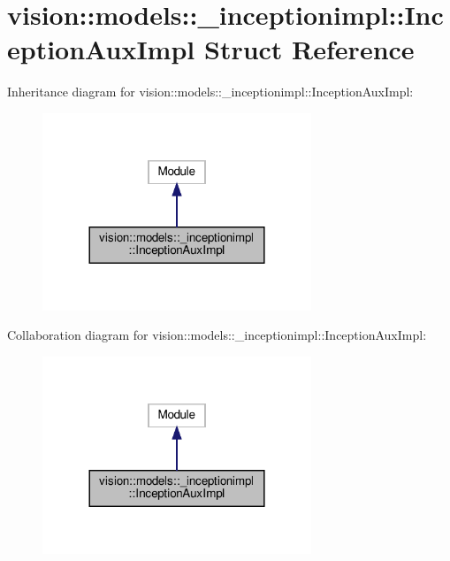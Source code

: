 \hypertarget{structvision_1_1models_1_1__inceptionimpl_1_1InceptionAuxImpl}{}\section{vision\+:\+:models\+:\+:\+\_\+inceptionimpl\+:\+:Inception\+Aux\+Impl Struct Reference}
\label{structvision_1_1models_1_1__inceptionimpl_1_1InceptionAuxImpl}


Inheritance diagram for vision\+:\+:models\+:\+:\+\_\+inceptionimpl\+:\+:Inception\+Aux\+Impl\+:
\nopagebreak
\begin{figure}[H]
\begin{center}
\leavevmode
\includegraphics[width=228pt]{structvision_1_1models_1_1__inceptionimpl_1_1InceptionAuxImpl__inherit__graph}
\end{center}
\end{figure}


Collaboration diagram for vision\+:\+:models\+:\+:\+\_\+inceptionimpl\+:\+:Inception\+Aux\+Impl\+:
\nopagebreak
\begin{figure}[H]
\begin{center}
\leavevmode
\includegraphics[width=228pt]{structvision_1_1models_1_1__inceptionimpl_1_1InceptionAuxImpl__coll__graph}
\end{center}
\end{figure}
